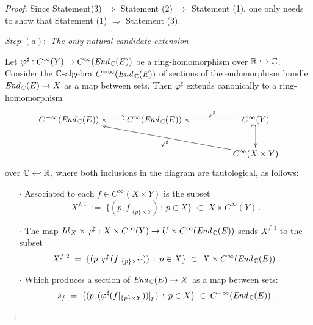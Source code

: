 \documentclass[11pt]{article}
\numberwithin{equation}{subsection}
\newcommand{\End}{\mbox{\it End}\,}
\newcommand{\Id}{\mbox{\it Id}\,}
\begin{document}
\begin{proof}
 Since Statement(3) $\Rightarrow$ Statement (2) $\Rightarrow$ Statement (1),
  one only needs to show that Statement (1) $\Rightarrow$ Statement (3).

 \bigskip

 \noindent
 {\it Step $(a):$ The only natural candidate extension}

 \medskip

 \noindent
 Let $\varphi^{\sharp}: C^{\infty}(Y)\rightarrow C^{\infty}(\End_{\Bbb C}(E))$
   be a ring-homomorphism over ${\Bbb R}\hookrightarrow {\Bbb C}$.
 Consider the ${\Bbb C}$-algebra $C^{-\infty}(\End_{\Bbb C}(E))$
   of sections of the endomorphism bundle
   $\End_{\Bbb C}(E)\rightarrow X$ as a map between sets.
 Then $\varphi^{\sharp}$ extends canonically to a ring-homomorphism
  $$
   \xymatrix{
     C^{-\infty}(\End_{\Bbb C}(E))
	  & \;C^{\infty}(\End_{\Bbb C}(E)) \ar@{_{(}->}[l]
	  &&  C^{\infty}(Y)\ar[ll]_-{\varphi^{\sharp}} \ar@{_{(}->}[d]  \\	
    &&&  C^{\infty}(X\times Y)\ar[lllu]^-{\tilde{\varphi}^{\sharp}}
	}
  $$
  over ${\Bbb C}\hookleftarrow{\Bbb R}$,
    where both inclusions in the diagram are tautological,
  as follows:
 \begin{itemize}
  \item[{\Large $\cdot$}]
    Associated to each $f\in C^{\infty}(X\times Y)$ is the subset
 	$$
	   X^{f;1}\; := \;
	       \{(p, f|_{\{p\}\times Y})\,:\, p\in X\}\; \subset\; X\times C^{\infty}(Y)\,.
    $$
	
  \item[{\Large $\cdot$}]	
   The map
      $\Id_X\times \varphi^{\sharp}:
	       X\times C^{\infty}(Y)\rightarrow U\times C^{\infty}(\End_{\Bbb C}(E))$
	sends $X^{f;1}$ to the subset
	$$
	  X^{f;2}\;=\;
	     \{(p,   \varphi^{\sharp}(f|_{\{p\}\times Y}))\,:\, p\in X\}\;
     		 \subset\; X \times C^{\infty}(\End_{\Bbb C}(E))\,.
	$$
 	
  \item[{\Large $\cdot$}]	
    Which produces a section of $\End_{\Bbb C}(E)\rightarrow X$ as a map between sets:
	 $$
	   s_f\; =\;
	      \{(p,
		        (\varphi^{\sharp}(f|_{\{p\}\times Y}))|_p)\,:\,
				  p\in X\}\;
     		 \in\; C^{-\infty}(\End_{\Bbb C}(E))\,.
     $$
	

\end{itemize}
\end{proof}
\end{document}

